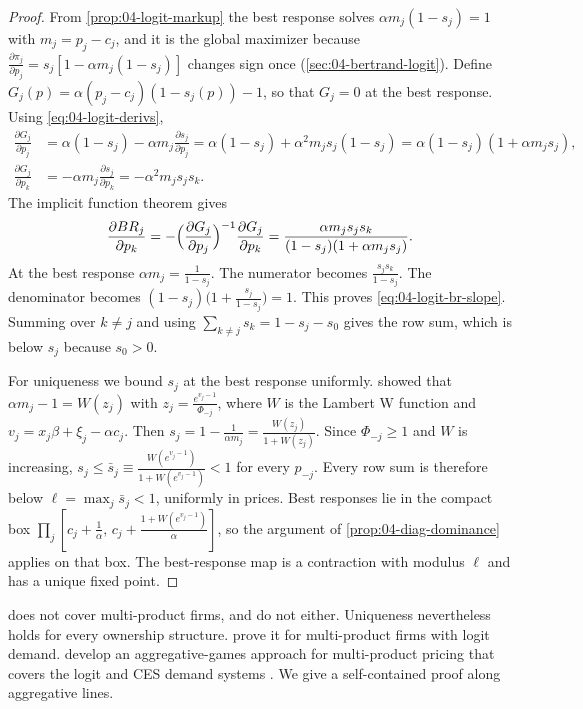 \begin{proof}
From \cref{prop:04-logit-markup} the best response solves $\alpha m_j(1 - s_j) = 1$ with $m_j = p_j - c_j$, and it is
the global maximizer because $\frac{\partial\pi_j}{\partial p_j} = s_j[1 - \alpha m_j(1 - s_j)]$ changes sign once
(\cref{sec:04-bertrand-logit}). Define $G_j(p) = \alpha(p_j - c_j)(1 - s_j(p)) - 1$, so that $G_j = 0$ at the best
response. Using \eqref{eq:04-logit-derivs},
\begin{align*}
  \frac{\partial G_j}{\partial p_j} &= \alpha(1 - s_j) - \alpha m_j\frac{\partial s_j}{\partial p_j}
    = \alpha(1 - s_j) + \alpha^2 m_j s_j(1 - s_j) = \alpha(1 - s_j)(1 + \alpha m_j s_j),\\
  \frac{\partial G_j}{\partial p_k} &= -\alpha m_j\frac{\partial s_j}{\partial p_k} = -\alpha^2 m_j s_j s_k.
\end{align*}
The implicit function theorem gives
\[
  \frac{\partial BR_j}{\partial p_k} = -\Bigl(\frac{\partial G_j}{\partial p_j}\Bigr)^{-1}\frac{\partial G_j}{\partial p_k}
  = \frac{\alpha m_j s_j s_k}{(1 - s_j)(1 + \alpha m_j s_j)}.
\]
At the best response $\alpha m_j = \frac{1}{1 - s_j}$. The numerator becomes $\frac{s_j s_k}{1 - s_j}$. The
denominator becomes $(1 - s_j)\bigl(1 + \frac{s_j}{1 - s_j}\bigr) = 1$. This proves \eqref{eq:04-logit-br-slope}.
Summing over $k \neq j$ and using $\sum_{k \neq j}s_k = 1 - s_j - s_0$ gives the row sum, which is below $s_j$
because $s_0 > 0$.

For uniqueness we bound $s_j$ at the best response uniformly.  showed that
$\alpha m_j - 1 = W(z_j)$ with $z_j = \frac{e^{v_j - 1}}{\Phi_{-j}}$, where $W$ is the Lambert W function and
$v_j = x_j\beta + \xi_j - \alpha c_j$. Then
$s_j = 1 - \frac{1}{\alpha m_j} = \frac{W(z_j)}{1 + W(z_j)}$. Since $\Phi_{-j} \ge 1$ and $W$ is increasing,
$s_j \le \bar s_j \equiv \frac{W(e^{v_j - 1})}{1 + W(e^{v_j - 1})} < 1$ for every $p_{-j}$. Every row sum is
therefore below $\ell = \max_j\bar s_j < 1$, uniformly in prices. Best responses lie in the compact box
$\prod_j[c_j + \frac{1}{\alpha},\, c_j + \frac{1 + W(e^{v_j - 1})}{\alpha}]$, so the argument of
\cref{prop:04-diag-dominance} applies on that box. The best-response map is a contraction with modulus $\ell$
and has a unique fixed point.
\end{proof}

 does not cover multi-product firms, and \citet{CaplinNalebuff1991} do not either. Uniqueness
nevertheless holds for every ownership structure. \citet[Theorem~7]{KonovalovSandor2010} prove it for multi-product firms with
logit demand. \citet{NockeSchutz2018} develop an aggregative-games approach for multi-product pricing that covers the
logit and CES demand systems \citep[p.~229, n.~127]{AskerNocke2021}. We give a self-contained proof along aggregative
lines.

